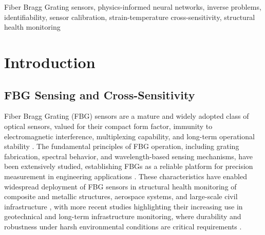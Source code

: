 \documentclass[journal,twoside,web]{ieeecolor}
\begin{document}
{{\begin{minipage}{\textwidth}
\begin{minipage}{\dimexpr\textwidth-1.2em}
\begin{abstract}
sub-2~pm accuracy when trained on only 20\% of the available data, and
remains stable under $\pm10\%$ perturbation of the sensor's sensitivity
coefficients. Because the combined thermo-mechanical regime lacks
independent ground-truth labels for strain and temperature individually, the
reported accuracy is established and interpreted at the level of wavelength
reconstruction and physical consistency, and is explicitly not claimed as an
independently validated decomposition of the two latent variables. This
distinction is treated as part of the scientific contribution rather than as
a caveat appended after the fact.
\end{abstract}




\begin{IEEEkeywords}
Fiber Bragg Grating sensors, physics-informed neural networks, inverse problems, identifiability, sensor calibration, strain-temperature cross-sensitivity, structural health monitoring
\end{IEEEkeywords}

\end{minipage}
\end{minipage}}}

\afterpage{\global\color{black}}

\maketitle

\section{Introduction}
\label{sec:introduction}

\subsection{FBG Sensing and Cross-Sensitivity}

Fiber Bragg Grating (FBG) sensors are a mature and widely adopted class of
optical sensors, valued for their compact form factor, immunity to
electromagnetic interference, multiplexing capability, and long-term
operational stability \cite{b1,b2}. The fundamental principles of FBG
operation, including grating fabrication, spectral behavior, and
wavelength-based sensing mechanisms, have been extensively studied,
establishing FBGs as a reliable platform for precision measurement in
engineering applications \cite{b3,b4}. These characteristics have enabled
widespread deployment of FBG sensors in structural health monitoring of
composite and metallic structures, aerospace systems, and large-scale civil
infrastructure \cite{b5,b6}, with more recent studies highlighting their
increasing use in geotechnical and long-term infrastructure monitoring,
where durability and robustness under harsh environmental conditions are
critical requirements \cite{b7}.
\end{document}
